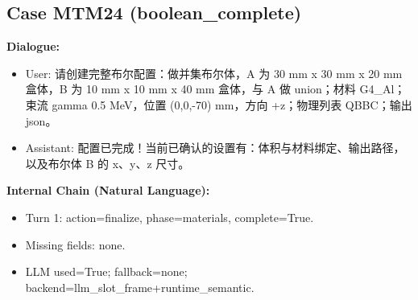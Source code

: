 \documentclass[11pt]{ctexart}
\begin{document}
\subsection{Case MTM24 (boolean\_complete)}
\textbf{Dialogue:}
\begin{itemize}
\item User: 请创建完整布尔配置：做并集布尔体，A 为 30 mm x 30 mm x 20 mm 盒体，B 为 10 mm x 10 mm x 40 mm 盒体，与 A 做 union；材料 G4\_Al；束流 gamma 0.5 MeV，位置 (0,0,-70) mm，方向 +z；物理列表 QBBC；输出 json。
\item Assistant: 配置已完成！当前已确认的设置有：体积与材料绑定、输出路径，以及布尔体 B 的 x、y、z 尺寸。
\end{itemize}
\textbf{Internal Chain (Natural Language):}
\begin{itemize}
\item Turn 1: action=finalize, phase=materials, complete=True.
\item Missing fields: none.
\item LLM used=True; fallback=none; backend=llm\_slot\_frame+runtime\_semantic.
\end{itemize}
\end{document}
